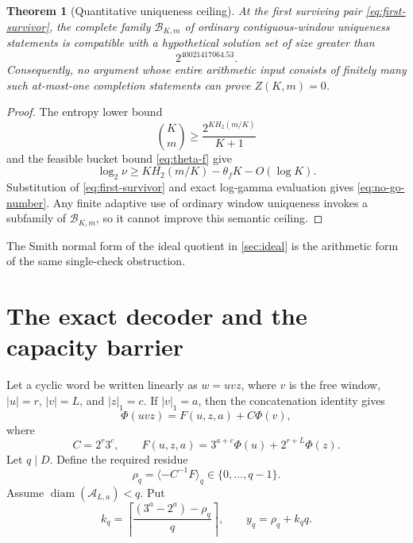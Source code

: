 \documentclass[11pt]{amsart}
\numberwithin{equation}{section}
\newtheorem{theorem}{Theorem}[section]
\newcommand{\A}{\mathcal A}
\begin{document}
\begin{theorem}[Quantitative uniqueness ceiling]\label{thm:quant-no-go}
At the first surviving pair \eqref{eq:first-survivor}, the complete family $\mathcal B_{K,m}$ of ordinary contiguous-window uniqueness statements is compatible with a hypothetical solution set of size greater than
\begin{equation}\label{eq:no-go-number}
2^{40021417064.53}.
\end{equation}
Consequently, no argument whose entire arithmetic input consists of finitely many such at-most-one completion statements can prove $Z(K,m)=0$.
\end{theorem}

\begin{proof}
The entropy lower bound
\[
\binom Km\ge\frac{2^{K H_2(m/K)}}{K+1}
\]
and the feasible bucket bound \eqref{eq:theta-f} give
\[
\log_2\nu
\ge
K H_2(m/K)-\theta_fK-O(\log K).
\]
Substitution of \eqref{eq:first-survivor} and exact log-gamma evaluation gives \eqref{eq:no-go-number}.  Any finite adaptive use of ordinary window uniqueness invokes a subfamily of $\mathcal B_{K,m}$, so it cannot improve this semantic ceiling.
\end{proof}

The Smith normal form of the ideal quotient in \cref{sec:ideal} is the arithmetic form of the same single-check obstruction.

\section{The exact decoder and the capacity barrier}\label{sec:decoder}

Let a cyclic word be written linearly as $w=uvz$, where $v$ is the free window, $|u|=r$, $|v|=L$, and $|z|_1=c$.  If $|v|_1=a$, then the concatenation identity gives
\begin{equation}\label{eq:three-block}
\Phi(uvz)=F(u,z,a)+C\Phi(v),
\end{equation}
where
\[
C=2^r3^c,
\qquad
F(u,z,a)=3^{a+c}\Phi(u)+2^{r+L}\Phi(z).
\]
Let $q\mid D$.  Define the required residue
\begin{equation}\label{eq:decoder-residue}
\rho_q=\langle-C^{-1}F\rangle_q\in\{0,\ldots,q-1\}.
\end{equation}
Assume $\operatorname{diam}(\A_{L,a})<q$.  Put
\begin{equation}\label{eq:decoder-lift}
k_q=\left\lceil\frac{(3^a-2^a)-\rho_q}{q}\right\rceil,
\qquad
y_q=\rho_q+k_qq.
\end{equation}
\end{document}

